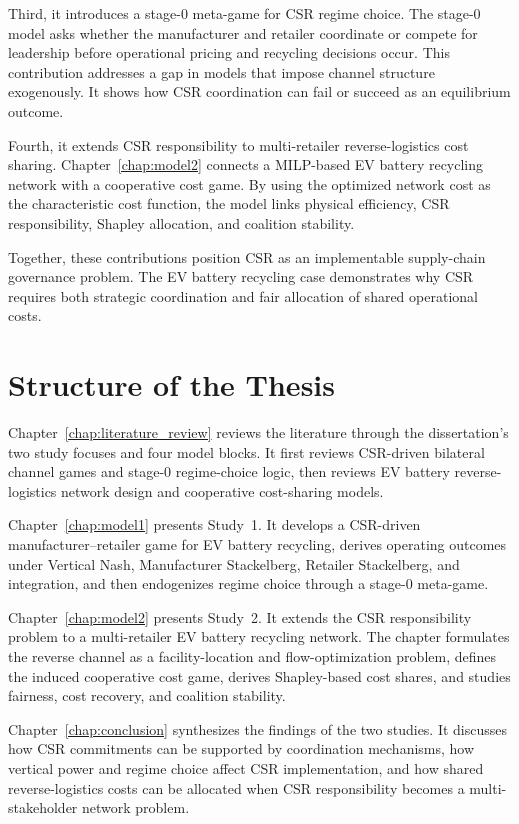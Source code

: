 Third, it introduces a stage-0 meta-game for CSR regime choice. The stage-0 model asks whether the manufacturer and retailer coordinate or compete for leadership before operational pricing and recycling decisions occur. This contribution addresses a gap in models that impose channel structure exogenously. It shows how CSR coordination can fail or succeed as an equilibrium outcome.

Fourth, it extends CSR responsibility to multi-retailer reverse-logistics cost sharing. Chapter~\ref{chap:model2} connects a MILP-based EV battery recycling network with a cooperative cost game. By using the optimized network cost as the characteristic cost function, the model links physical efficiency, CSR responsibility, Shapley allocation, and coalition stability.

Together, these contributions position CSR as an implementable supply-chain governance problem. The EV battery recycling case demonstrates why CSR requires both strategic coordination and fair allocation of shared operational costs.

\section{Structure of the Thesis}
\label{sec:intro_structure}

Chapter~\ref{chap:literature_review} reviews the literature through the dissertation's two study focuses and four model blocks. It first reviews CSR-driven bilateral channel games and stage-0 regime-choice logic, then reviews EV battery reverse-logistics network design and cooperative cost-sharing models.

Chapter~\ref{chap:model1} presents Study~1. It develops a CSR-driven manufacturer--retailer game for EV battery recycling, derives operating outcomes under Vertical Nash, Manufacturer Stackelberg, Retailer Stackelberg, and integration, and then endogenizes regime choice through a stage-0 meta-game.

Chapter~\ref{chap:model2} presents Study~2. It extends the CSR responsibility problem to a multi-retailer EV battery recycling network. The chapter formulates the reverse channel as a facility-location and flow-optimization problem, defines the induced cooperative cost game, derives Shapley-based cost shares, and studies fairness, cost recovery, and coalition stability.

Chapter~\ref{chap:conclusion} synthesizes the findings of the two studies. It discusses how CSR commitments can be supported by coordination mechanisms, how vertical power and regime choice affect CSR implementation, and how shared reverse-logistics costs can be allocated when CSR responsibility becomes a multi-stakeholder network problem.

